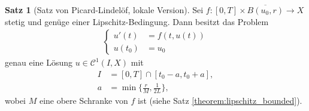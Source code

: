 \documentclass[a4paper]{article}
\theoremstyle{definition}
\newtheorem{theorem}{Satz}
\begin{document}
\begin{theorem}[Satz von Picard-Lindelöf, lokale Version]
Sei $f:[0,T] \times \overline{B(u_0,r)} \to X$ stetig und genüge einer Lipschitz-Bedingung. Dann besitzt das Problem
\begin{align*}
    \begin{cases}
        u'(t) &= f(t, u(t)) \\
        u(t_0) &= u_0
    \end{cases}
\end{align*}
genau eine Lösung $u \in \mathcal C^{1}(I, X)$ mit 
\begin{align*}
    I &= [0,T] \cap [t_0 - a, t_0 + a], \\  
    a &= \min\{ \frac{r}{M}, \frac{1}{2L} \},
\end{align*}
wobei $M$ eine obere Schranke von $f$ ist (siehe Satz \ref{theorem:lipschitz_bounded}).
\end{theorem}
\end{document}
